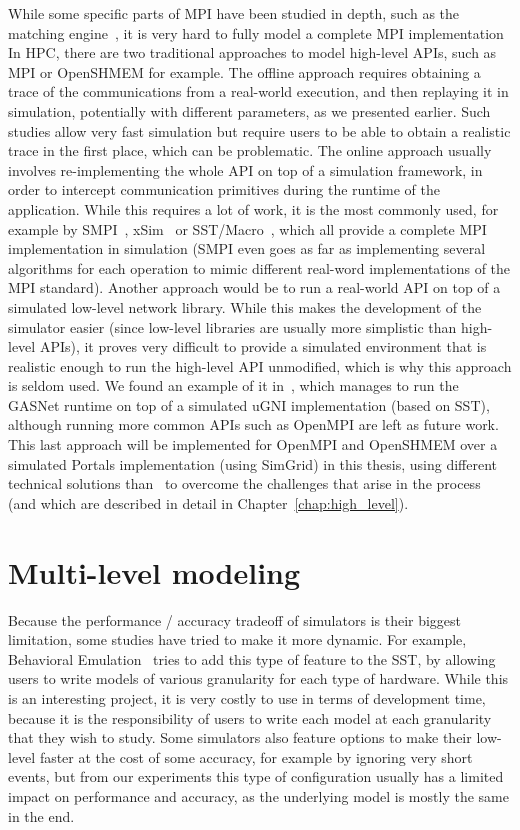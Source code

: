 While some specific parts of MPI have been studied in depth, such as the
matching engine~\cite{Levy2019}, it is very hard to fully model a complete MPI
implementation In HPC, there are two traditional approaches to model high-level
APIs, such as MPI or OpenSHMEM for example. The offline approach requires
obtaining a trace of the communications from a real-world execution, and then
replaying it in simulation, potentially with different parameters, as we
presented earlier. Such studies allow very fast simulation but require users to
be able to obtain a realistic trace in the first place, which can be
problematic. The online approach usually involves re-implementing the whole API
on top of a simulation framework, in order to intercept communication primitives
during the runtime of the application. While this requires a lot of work, it is
the most commonly used, for example by SMPI~\cite{Degomme2017a},
xSim~\cite{Bohm2011} or SST/Macro~\cite{Hendry}, which all provide a complete
MPI implementation in simulation (SMPI even goes as far as implementing several
algorithms for each operation to mimic different real-word implementations of
the MPI standard). Another approach would be to run a real-world API on top of a
simulated low-level network library. While this makes the development of the
simulator easier (since low-level libraries are usually more simplistic than
high-level APIs), it proves very difficult to provide a simulated environment
that is realistic enough to run the high-level API unmodified, which is why this
approach is seldom used. We found an example of it in~\cite{Knight2018}, which
manages to run the GASNet runtime on top of a simulated uGNI implementation
(based on SST), although running more common APIs such as OpenMPI are left as
future work. This last approach will be implemented for OpenMPI and OpenSHMEM
over a simulated Portals implementation (using SimGrid) in this thesis, using
different technical solutions than~\cite{Knight2018} to overcome the challenges
that arise in the process (and which are described in detail in
Chapter~\ref{chap:high_level}).

\section{Multi-level modeling}

Because the performance / accuracy tradeoff of simulators is their biggest
limitation, some studies have tried to make it more dynamic. For example,
Behavioral Emulation~\cite{Ramaswamy2018} tries to add this type of feature to
the SST, by allowing users to write models of various granularity for each type
of hardware. While this is an interesting project, it is very costly to use in
terms of development time, because it is the responsibility of users to write
each model at each granularity that they wish to study. Some simulators also
feature options to make their low-level faster at the cost of some accuracy, for
example by ignoring very short events, but from our experiments this type of
configuration usually has a limited impact on performance and accuracy, as the
underlying model is mostly the same in the end.
